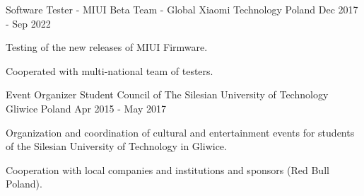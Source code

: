 

\begin{cventries}

  \cventry
    {Software Tester - MIUI Beta Team - Global} %
    {Xiaomi Technology} %
    {Poland} %
    {Dec 2017 - Sep 2022} %
    {
      \begin{cvitems} %
        \item {Testing of the new releases of MIUI Firmware.}
        \item {Cooperated with multi-national team of testers.}
      \end{cvitems}
    }

  \cventry
    {Event Organizer} %
    {Student Council of The Silesian University of Technology} %
    {Gliwice Poland} %
    {Apr 2015 - May 2017 } %
    {
      \begin{cvitems} %
        \item {Organization and coordination of cultural and entertainment events for students of the Silesian University of Technology in Gliwice.}
        \item {Cooperation with local companies and institutions and sponsors (Red Bull Poland).}
      \end{cvitems}
    }

\end{cventries}

